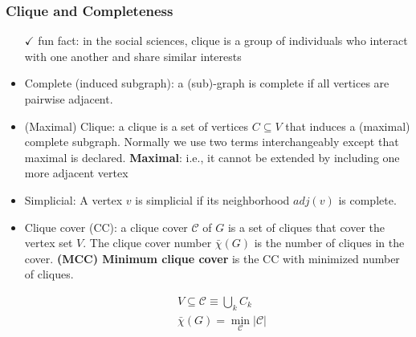 \subsubsection*{Clique and Completeness}
\begin{itemize}
      \tightlist
      \item[\(\checkmark\)] fun fact: in the social sciences, clique is a group of individuals who interact with one another and share similar interests
      \item Complete (induced subgraph): a (sub)-graph is complete if all vertices are pairwise adjacent.
      \item (Maximal) Clique: a clique is a set of vertices \(C \subseteq V\) that induces a (maximal) complete subgraph. Normally we use two terms interchangeably except that maximal is declared. \textbf{Maximal}: i.e., it cannot be extended by including one more adjacent vertex
      \item Simplicial: A vertex \(v\) is simplicial if its neighborhood \(adj(v)\) is complete.
      \item Clique cover (CC): a clique cover \(\mathscr C\) of \(G\) is a set of
            cliques that cover the vertex set \(V\). The clique cover number
            \(\bar \chi (G)\) is the number of cliques in the cover. \textbf{(MCC) Minimum clique cover} is the CC with minimized number of cliques.

            \begin{equation}
                  \begin{aligned}
                         & V \subseteq \mathscr C \equiv \bigcup_k C_k    \\
                         & \bar \chi (G) = \min_{\mathscr C} |\mathscr C|
                  \end{aligned}
            \end{equation}


\end{itemize}



